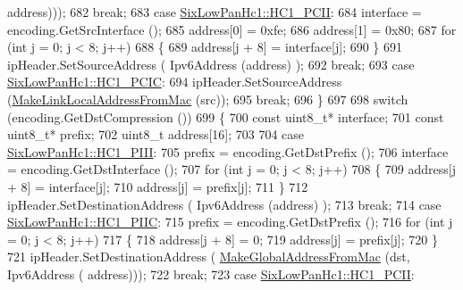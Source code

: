 \begin{DoxyCode}
      address)));
682       \textcolor{keywordflow}{break};
683     \textcolor{keywordflow}{case} \hyperlink{classns3_1_1SixLowPanHc1_a29c864d9bf6bc466ee2214a95a83dcada3b9d64b07cd392302c87ed69164f0793}{SixLowPanHc1::HC1\_PCII}:
684       \textcolor{keyword}{interface }= encoding.GetSrcInterface ();
685       address[0] = 0xfe;
686       address[1] = 0x80;
687       \textcolor{keywordflow}{for} (\textcolor{keywordtype}{int} j = 0; j < 8; j++)
688         \{
689           address[j + 8] = interface[j];
690         \}
691       ipHeader.SetSourceAddress ( Ipv6Address (address) );
692       \textcolor{keywordflow}{break};
693     \textcolor{keywordflow}{case} \hyperlink{classns3_1_1SixLowPanHc1_a29c864d9bf6bc466ee2214a95a83dcada2e3b9656c8f4d8912d0bf078533e298f}{SixLowPanHc1::HC1\_PCIC}:
694       ipHeader.SetSourceAddress (\hyperlink{classns3_1_1SixLowPanNetDevice_acf66b0ff019d0f1b88212d452044696e}{MakeLinkLocalAddressFromMac} (src));
695       \textcolor{keywordflow}{break};
696     \}
697 
698   \textcolor{keywordflow}{switch} (encoding.GetDstCompression ())
699     \{
700       \textcolor{keyword}{const} uint8\_t* interface;
701       \textcolor{keyword}{const} uint8\_t* prefix;
702       uint8\_t address[16];
703 
704     \textcolor{keywordflow}{case} \hyperlink{classns3_1_1SixLowPanHc1_a29c864d9bf6bc466ee2214a95a83dcada33fbbb35ed064759434a773a85d2d325}{SixLowPanHc1::HC1\_PIII}:
705       prefix = encoding.GetDstPrefix ();
706       \textcolor{keyword}{interface }= encoding.GetDstInterface ();
707       \textcolor{keywordflow}{for} (\textcolor{keywordtype}{int} j = 0; j < 8; j++)
708         \{
709           address[j + 8] = interface[j];
710           address[j] = prefix[j];
711         \}
712       ipHeader.SetDestinationAddress ( Ipv6Address (address) );
713       \textcolor{keywordflow}{break};
714     \textcolor{keywordflow}{case} \hyperlink{classns3_1_1SixLowPanHc1_a29c864d9bf6bc466ee2214a95a83dcada8e07a41c91e304c47d01515d51d399ca}{SixLowPanHc1::HC1\_PIIC}:
715       prefix = encoding.GetDstPrefix ();
716       \textcolor{keywordflow}{for} (\textcolor{keywordtype}{int} j = 0; j < 8; j++)
717         \{
718           address[j + 8] = 0;
719           address[j] = prefix[j];
720         \}
721       ipHeader.SetDestinationAddress ( \hyperlink{classns3_1_1SixLowPanNetDevice_af8af918eb21378d30eb0e1b45e978fff}{MakeGlobalAddressFromMac} (dst, Ipv6Address (
      address)));
722       \textcolor{keywordflow}{break};
723     \textcolor{keywordflow}{case} \hyperlink{classns3_1_1SixLowPanHc1_a29c864d9bf6bc466ee2214a95a83dcada3b9d64b07cd392302c87ed69164f0793}{SixLowPanHc1::HC1\_PCII}:

\end{DoxyCode}

